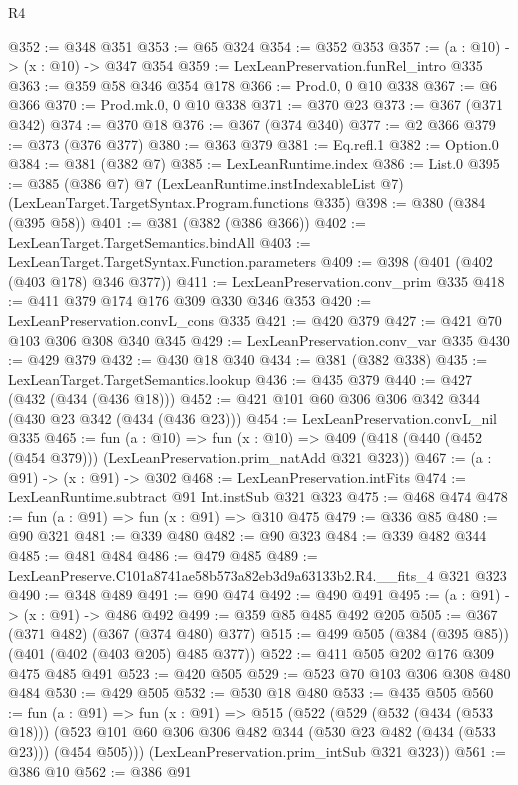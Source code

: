 \begin{lexlean}{R4}
\begin{coremodule}
@352 := @348 @351
@353 := @65 @324
@354 := @352 @353
@357 := (a : @10) -> (x : @10) -> @347 @354
@359 := LexLeanPreservation.funRel_intro @335
@363 := @359 @58 @346 @354 @178
@366 := Prod.{0, 0} @10 @338
@367 := @6 @366
@370 := Prod.mk.{0, 0} @10 @338
@371 := @370 @23
@373 := @367 (@371 @342)
@374 := @370 @18
@376 := @367 (@374 @340)
@377 := @2 @366
@379 := @373 (@376 @377)
@380 := @363 @379
@381 := Eq.refl.{1}
@382 := Option.{0}
@384 := @381 (@382 @7)
@385 := LexLeanRuntime.index
@386 := List.{0}
@395 := @385
    (@386 @7)
    @7
    (LexLeanRuntime.instIndexableList @7)
    (LexLeanTarget.TargetSyntax.Program.functions @335)
@398 := @380 (@384 (@395 @58))
@401 := @381 (@382 (@386 @366))
@402 := LexLeanTarget.TargetSemantics.bindAll
@403 := LexLeanTarget.TargetSyntax.Function.parameters
@409 := @398 (@401 (@402 (@403 @178) @346 @377))
@411 := LexLeanPreservation.conv_prim @335
@418 := @411 @379 @174 @176 @309 @330 @346 @353
@420 := LexLeanPreservation.convL_cons @335
@421 := @420 @379
@427 := @421 @70 @103 @306 @308 @340 @345
@429 := LexLeanPreservation.conv_var @335
@430 := @429 @379
@432 := @430 @18 @340
@434 := @381 (@382 @338)
@435 := LexLeanTarget.TargetSemantics.lookup
@436 := @435 @379
@440 := @427 (@432 (@434 (@436 @18)))
@452 := @421 @101 @60 @306 @306 @342 @344 (@430 @23 @342 (@434 (@436 @23)))
@454 := LexLeanPreservation.convL_nil @335
@465 := fun (a : @10) =>
  fun (x : @10) => @409 (@418 (@440 (@452 (@454 @379))) (LexLeanPreservation.prim_natAdd @321 @323))
@467 := (a : @91) -> (x : @91) -> @302
@468 := LexLeanPreservation.intFits
@474 := LexLeanRuntime.subtract @91 Int.instSub @321 @323
@475 := @468 @474
@478 := fun (a : @91) => fun (x : @91) => @310 @475
@479 := @336 @85
@480 := @90 @321
@481 := @339 @480
@482 := @90 @323
@484 := @339 @482 @344
@485 := @481 @484
@486 := @479 @485
@489 := LexLeanPreserve.C101a8741ae58b573a82eb3d9a63133b2.R4.__fits_4 @321 @323
@490 := @348 @489
@491 := @90 @474
@492 := @490 @491
@495 := (a : @91) -> (x : @91) -> @486 @492
@499 := @359 @85 @485 @492 @205
@505 := @367 (@371 @482) (@367 (@374 @480) @377)
@515 := @499 @505 (@384 (@395 @85)) (@401 (@402 (@403 @205) @485 @377))
@522 := @411 @505 @202 @176 @309 @475 @485 @491
@523 := @420 @505
@529 := @523 @70 @103 @306 @308 @480 @484
@530 := @429 @505
@532 := @530 @18 @480
@533 := @435 @505
@560 := fun (a : @91) =>
  fun (x : @91) =>
  @515
    (@522
      (@529
        (@532 (@434 (@533 @18)))
        (@523 @101 @60 @306 @306 @482 @344 (@530 @23 @482 (@434 (@533 @23))) (@454 @505)))
      (LexLeanPreservation.prim_intSub @321 @323))
@561 := @386 @10
@562 := @386 @91

\end{coremodule}
\end{lexlean}
